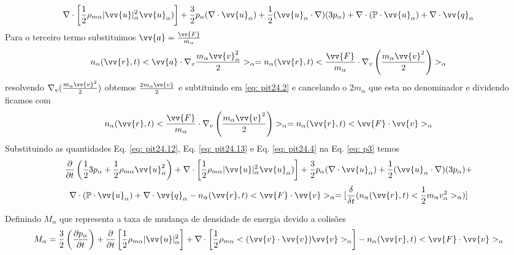 \documentclass[12pt,oneside,a4paper]{abntex2}
\theoremstyle{definition}  %
\begin{document}
\begin{equation*}
\nabla \cdot \left[ \frac{1}{2}\rho_{m\alpha}|\vv{u}|^2_\alpha \vv{u}_\alpha) \right]+ \frac{3}{2}p_\alpha (\nabla \cdot \vv{u}_\alpha) +  \frac{1}{2}(\vv{u}_\alpha \cdot \nabla)(3p_\alpha)+\nabla \cdot (\mathbb{P} \cdot \vv{u}_\alpha) + \nabla \cdot \vv{q}_\alpha
\end{equation*}
Para o terceiro termo substituimos $\vv{a} =  \frac{\vv{F}}{m_\alpha}$ 
\begin{equation}
\label{eq: pit24.21}
n_\alpha(\vv{r},t) <\vv{a} \cdot \nabla_v \frac{m_\alpha \vv{v}^2_\alpha}{2}>_\alpha = n_\alpha(\vv{r},t)<\frac{\vv{F}}{m_\alpha} \cdot \nabla_v \left( \frac{m_\alpha \vv{v}^2}{2}\right)>_\alpha 
\end{equation}
resolvendo $\nabla_v ( \frac{m_\alpha \vv{v}^2}{2})$ obtemos $\frac{2m_\alpha \vv{v}}{2}$ e subtituindo em \ref{eq: pit24.2} e cancelando o $2m_\alpha$ que esta no denominador e dividendo ficamos com
\begin{equation}
\label{eq: pit24.4}
n_\alpha(\vv{r},t)<\frac{\vv{F}}{m_\alpha} \cdot \nabla_v \left( \frac{m_\alpha \vv{v}^2}{2}\right)>_\alpha = n_\alpha(\vv{r},t) <\vv{F} \cdot \vv{v}>_\alpha
\end{equation}
Substituindo as quantidades Eq. \ref{eq: pit24.12}, Eq. \ref{eq: pit24.13} e Eq. \ref{eq: pit24.4} na Eq. \ref{eq: p3} temos
\begin{equation}
\label{eq: p4}
\frac{\partial }{\partial t}  \left( \frac{1}{2} 3p_\alpha+\frac{1}{2} \rho_{m\alpha}\vv{u}^2_\alpha \right) +\nabla \cdot \left[ \frac{1}{2}\rho_{m\alpha}|\vv{u}|^2_\alpha \vv{u}_\alpha) \right]+ \frac{3}{2}p_\alpha (\nabla \cdot \vv{u}_\alpha) +  \frac{1}{2}(\vv{u}_\alpha \cdot \nabla)(3p_\alpha)+ 
\end{equation}
\begin{equation*}
\nabla \cdot (\mathbb{P} \cdot \vv{u}_\alpha) + \nabla \cdot \vv{q}_\alpha-n_\alpha(\vv{r},t) <\vv{F} \cdot \vv{v}>_\alpha =[\frac{\delta}{\delta t}(n_\alpha(\vv{r},t)<\frac{1}{2}m_\alpha v_{\alpha}^2>_\alpha)]
\end{equation*}

Definindo $M_\alpha$ que representa a taxa de mudança de densidade de energia devido a colisões
\begin{equation}
M_\alpha = \frac{3}{2} \left(  \frac{\partial p_\alpha}{\partial t}  \right) + \frac{\partial}{\partial t} \left[ \frac{1}{2}\rho_{m\alpha}|\vv{u}|^2_\alpha \right]+ \nabla \cdot \left[\frac{1}{2}\rho_{m\alpha}<(\vv{v} \cdot \vv{v})\vv{v}>_\alpha \right] -  n_\alpha(\vv{r},t)<\vv{F} \cdot \vv{v}>_\alpha
\end{equation}
\end{document}
